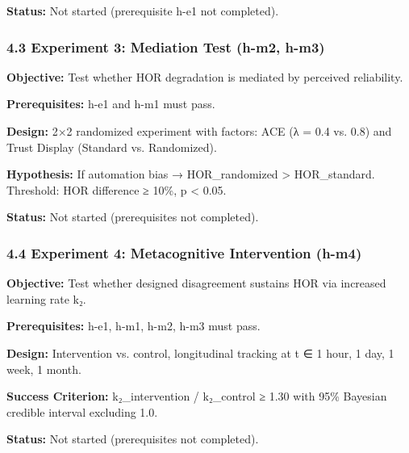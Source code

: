 \textbf{Status:} Not started (prerequisite h-e1 not completed).

\subsubsection{4.3 Experiment 3: Mediation Test (h-m2, h-m3)}

\textbf{Objective:} Test whether HOR degradation is mediated by perceived reliability.

\textbf{Prerequisites:} h-e1 and h-m1 must pass.

\textbf{Design:} 2×2 randomized experiment with factors: ACE (λ = 0.4 vs. 0.8) and Trust Display (Standard vs. Randomized).

\textbf{Hypothesis:} If automation bias → HOR_randomized > HOR_standard. Threshold: HOR difference ≥ 10\%, p < 0.05.

\textbf{Status:} Not started (prerequisites not completed).

\subsubsection{4.4 Experiment 4: Metacognitive Intervention (h-m4)}

\textbf{Objective:} Test whether designed disagreement sustains HOR via increased learning rate k₂.

\textbf{Prerequisites:} h-e1, h-m1, h-m2, h-m3 must pass.

\textbf{Design:} Intervention vs. control, longitudinal tracking at t ∈ {1 hour, 1 day, 1 week, 1 month}.

\textbf{Success Criterion:} k₂_intervention / k₂_control ≥ 1.30 with 95\% Bayesian credible interval excluding 1.0.

\textbf{Status:} Not started (prerequisites not completed).
